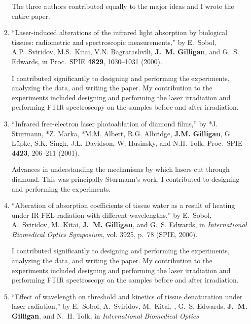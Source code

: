\begin{enumerate}
	\begin{credit}
	The three authors contributed equally to the major ideas and I wrote the entire paper.
	\end{credit}
	\item
	\enquote{Laser-induced alterations of the infrared light absorption by biological tissues: radiometric and spectroscopic measurements,}  by E.~Sobol, A.P.~Sviridov, M.S.~Kitai, V.N. Bagratashvili, \textbf{J.~M. Gilligan}, and G.~S. Edwards, in
	  Proc.~SPIE \textbf{4829}, 1030--1031 (2000). 
	  \begin{credit}
	  I contributed significantly to designing and performing the experiments, analyzing the data, and writing the paper. My contribution to the experiments included designing and performing the laser irradiation and performing FTIR spectroscopy on the samples before and after irradiation.
	  \end{credit}
	\item
	\enquote{Infrared free-electron laser photoablation of diamond films,} by *J. Sturmann, *Z. Marka, *M.M. Albert, R.G. Albridge, \textbf{J.M. Gilligan}, G. L\"upke, S.K. Singh, J.L. Davidson, W. Husinsky, and N.H. Tolk,
	Proc.~SPIE \textbf{4423}, 206--211 (2001).
	  \begin{credit}
	  Advances in understanding the mechanisms by which lasers cut through diamond.
	  This was principally Sturmann's work. I contributed to designing and performing the experiments.
	  \end{credit}
	\item
	\enquote{Alteration of absorption coefficients of tissue water as a result of
	  heating under {IR} {FEL} radiation with different wavelengths,}  by E.~Sobol,
	  A.~Sviridov, M.~Kitai, \textbf{J.~M. Gilligan}, and G.~S. Edwards, in
	  \emph{International Biomedical Optics Symposium}, vol. 3925, p.~78 (SPIE,
	  2000). 
	  \begin{credit}
	  I contributed significantly to designing and performing the experiments, analyzing the data, and writing the paper. My contribution to the experiments included designing and performing the laser irradiation and performing FTIR spectroscopy on the samples before and after irradiation.
	  \end{credit}
	\item
	\enquote{Effect of wavelength on threshold and kinetics of tissue denaturation
	  under laser radiation,}  by E.~Sobol, A.~Sviridov, M.~Kitai, , G.~S. Edwards,
	  \textbf{J.~M. Gilligan}, and N.~H. Tolk, in \emph{International Biomedical Optics
}
\end{enumerate}
